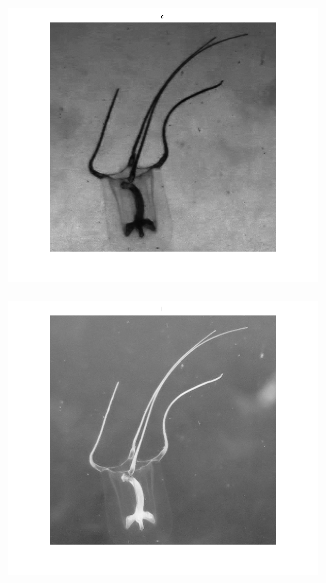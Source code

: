 \documentclass{article}
\begin{document}
\begin{figure}[H]
\begin{subfigure}{0.5\textwidth}
        \includegraphics[width=0.9\textwidth]{1901-hsi-s.png}
    \end{subfigure}\hfill
	\begin{subfigure}{0.5\textwidth}
	\centering
        \includegraphics[width=0.9\textwidth]{1901-hsi-i.png}
    \end{subfigure}\hfill
	\centering
	\begin{subfigure}{0.5\textwidth}
	\centering

\end{subfigure}
\end{figure}
\end{document}
